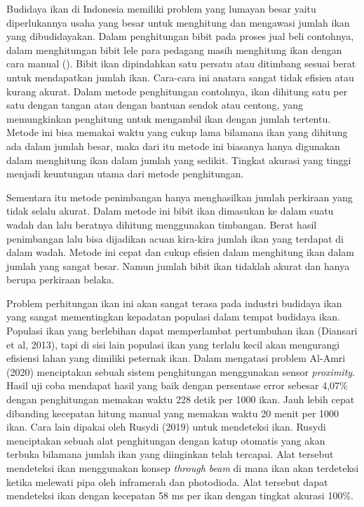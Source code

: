 Budidaya ikan di Indonesia memiliki problem yang lumayan besar yaitu 
diperlukannya usaha yang besar untuk menghitung dan mengawasi jumlah ikan 
yang dibudidayakan. Dalam penghitungan bibit pada proses jual beli contohnya, 
dalam menghitungan bibit lele para pedagang masih menghitung ikan dengan 
cara manual (\cite{alamri}). Bibit ikan dipindahkan satu persatu atau 
ditimbang sesuai berat untuk mendapatkan jumlah ikan. Cara-cara ini anatara sangat tidak 
efisien atau kurang akurat. Dalam metode penghitungan contohnya, ikan 
dihitung satu per satu dengan tangan atau dengan bantuan sendok atau centong, 
yang memungkinkan penghitung untuk mengambil ikan dengan jumlah tertentu. 
Metode ini bisa memakai waktu yang cukup lama bilamana ikan yang dihitung 
ada dalam jumlah besar, maka dari itu metode ini biasanya hanya digunakan 
dalam menghitung ikan dalam jumlah yang sedikit. Tingkat akurasi yang 
tinggi menjadi keuntungan utama dari metode penghitungan.

Sementara itu metode penimbangan hanya menghasilkan jumlah perkiraan yang tidak 
selalu akurat. Dalam metode ini bibit ikan dimasukan ke dalam suatu wadah dan lalu 
beratnya dihitung menggunakan timbangan. Berat hasil penimbangan lalu bisa 
dijadikan acuan kira-kira jumlah ikan yang terdapat di dalam wadah. 
Metode ini cepat dan cukup efisien dalam menghitung ikan dalam jumlah yang 
sangat besar. Namun jumlah bibit ikan tidaklah akurat dan hanya berupa perkiraan belaka.

Problem perhitungan ikan ini akan sangat terasa pada industri budidaya ikan yang 
sangat mementingkan kepadatan populasi dalam tempat budidaya ikan. Populasi ikan 
yang berlebihan dapat memperlambat pertumbuhan ikan (Diansari et al, 2013), tapi 
di sisi lain populasi ikan yang terlalu kecil akan mengurangi efisiensi lahan 
yang dimiliki peternak ikan. Dalam mengatasi problem Al-Amri (2020) menciptakan 
sebuah sistem penghitungan menggunakan sensor \emph{proximity}. Hasil uji coba mendapat 
hasil yang baik dengan persentase error sebesar 4,07\% dengan penghitungan 
memakan waktu 228 detik per 1000 ikan. Jauh lebih cepat dibanding kecepatan 
hitung manual yang memakan waktu 20 menit per 1000 ikan. Cara lain dipakai 
oleh Rusydi (2019) untuk mendeteksi ikan. Rusydi menciptakan sebuah alat 
penghitungan dengan katup otomatis yang akan terbuka bilamana jumlah ikan 
yang diinginkan telah tercapai. Alat tersebut mendeteksi ikan menggunakan 
konsep \emph{through beam} di mana ikan akan terdeteksi ketika melewati pipa oleh 
inframerah dan photodioda. Alat tersebut dapat mendeteksi ikan dengan 
kecepatan 58 ms per ikan dengan tingkat akurasi 100\%.

